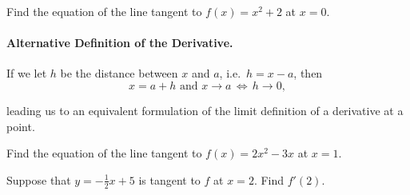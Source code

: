 \documentclass[12pt]{article}
\begin{document}
\vspace{50mm}

\Example Find the equation of the line tangent to $f(x)=x^2+2$ at $x=0$.

\vspace{50mm}

\paragraph{Alternative Definition of the Derivative.} If we let $h$ be the distance between $x$ and $a$, i.e.\ $h=x-a$, then
$$x=a+h\text{ and } x\to a \,\Longleftrightarrow\, h\to 0,$$

leading us to an equivalent formulation of the limit definition of a derivative at a point.

\vspace{5mm}


\vspace{5mm}


\newpage

\Example Find the equation of the line tangent to $f(x)=2x^2-3x$ at $x=1$.

\vspace{50mm}

\Example Suppose that $y=-\frac{1}{2}x+5$ is tangent to $f$ at $x=2$. Find $f'(2)$.
\end{document}
